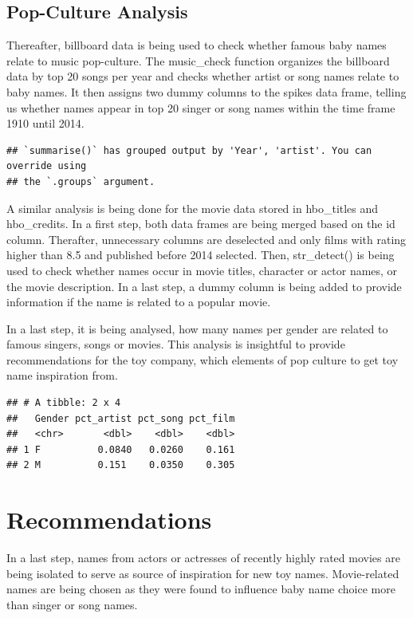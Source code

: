 \documentclass[11pt,preprint]{elsarticle}
\numberwithin{equation}{section}
\numberwithin{figure}{section}
\numberwithin{table}{section}
\begin{document}
\subsection{Pop-Culture Analysis}\label{pop-culture-analysis}

Thereafter, billboard data is being used to check whether famous baby
names relate to music pop-culture. The music\_check function organizes
the billboard data by top 20 songs per year and checks whether artist or
song names relate to baby names. It then assigns two dummy columns to
the spikes data frame, telling us whether names appear in top 20 singer
or song names within the time frame 1910 until 2014.

\begin{verbatim}
## `summarise()` has grouped output by 'Year', 'artist'. You can override using
## the `.groups` argument.
\end{verbatim}

A similar analysis is being done for the movie data stored in
hbo\_titles and hbo\_credits. In a first step, both data frames are
being merged based on the id column. Therafter, unnecessary columns are
deselected and only films with rating higher than 8.5 and published
before 2014 selected. Then, str\_detect() is being used to check whether
names occur in movie titles, character or actor names, or the movie
description. In a last step, a dummy column is being added to provide
information if the name is related to a popular movie.

In a last step, it is being analysed, how many names per gender are
related to famous singers, songs or movies. This analysis is insightful
to provide recommendations for the toy company, which elements of pop
culture to get toy name inspiration from.

\begin{verbatim}
## # A tibble: 2 x 4
##   Gender pct_artist pct_song pct_film
##   <chr>       <dbl>    <dbl>    <dbl>
## 1 F          0.0840   0.0260    0.161
## 2 M          0.151    0.0350    0.305
\end{verbatim}

\section{Recommendations}\label{recommendations}

In a last step, names from actors or actresses of recently highly rated
movies are being isolated to serve as source of inspiration for new toy
names. Movie-related names are being chosen as they were found to
influence baby name choice more than singer or song names.
\end{document}
